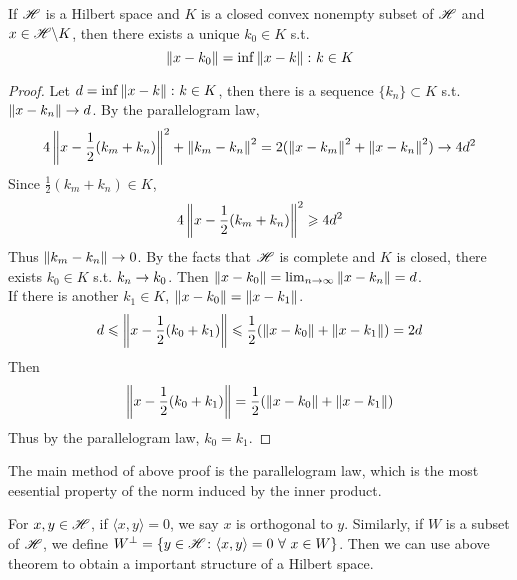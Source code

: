 \documentclass[a4paper,11pt]{report}
\begin{document}
\begin{thm}
	If $\mathscr{H}$ is a Hilbert space and $K$ is a closed convex nonempty subset of $\mathscr{H}$ and $x \in \mathscr{H} \backslash K$, then there exists a unique $k_0 \in K$ s.t.
	\begin{equation*}
		\left\lVert x-k_0\right\lVert = \operatorname{inf}{\left\lVert x-k\right\lVert \colon k \in K}
	\end{equation*}
\end{thm}
\begin{proof}
	Let $d=\operatorname{inf}{\left\lVert x-k\right\lVert \colon k \in K}$, then there is a sequence $\{k_n\} \subset K$ s.t. $\left\lVert x-k_n\right\lVert \rightarrow d$. By the parallelogram law,
	\begin{equation*}
		4\left\lVert x-\frac{1}{2}(k_m+k_n)\right\lVert^{2}+\left\lVert k_m-k_n\right\lVert^{2} = 2(\left\lVert x-k_m\right\lVert^{2}+\left\lVert x-k_n\right\lVert^{2}) \rightarrow 4d^{2}
	\end{equation*}
	Since $\frac{1}{2}(k_m+k_n) \in K$, 
	\begin{equation*}
		4\left\lVert x-\frac{1}{2}(k_m+k_n)\right\lVert^{2} \geqslant 4d^{2}
	\end{equation*}
	Thus $\left\lVert k_m-k_n\right\lVert \rightarrow 0$. By the facts that $\mathscr{H}$ is complete and $K$ is closed, there exists $k_0 \in K$ s.t. $k_n \rightarrow k_0$. Then $\left\lVert x-k_0\right\lVert = \lim_{n \rightarrow \infty}\left\lVert x-k_n\right\lVert = d$.\\
	If there is another $k_1 \in K$, $\left\lVert x-k_0\right\lVert = \left\lVert x-k_1\right\lVert$.
	\begin{equation*}
		d \leqslant \left\lVert x-\frac{1}{2}(k_0+k_1)\right\lVert \leqslant \frac{1}{2}(\left\lVert x-k_0\right\lVert+\left\lVert x-k_1\right\lVert) = 2d
	\end{equation*}
	Then
	\begin{equation*}
		\left\lVert x-\frac{1}{2}(k_0+k_1)\right\lVert = \frac{1}{2}(\left\lVert x-k_0\right\lVert+\left\lVert x-k_1\right\lVert)
	\end{equation*}
	Thus by the parallelogram law, $k_0 = k_1$.
\end{proof}	
\begin{rem}
	The main method of above proof is the parallelogram law, which is the most eesential property of the norm induced by the inner product.
\end{rem}

For $x,y \in \mathscr{H}$, if $ \langle x,y \rangle=0$, we say $x$ is orthogonal to $y$. Similarly, if $W$ is a subset of $\mathscr{H}$, we define $W^{\bot} = \{y \in \mathscr{H} \colon  \langle x,y \rangle=0 ~\forall~ x \in W\}$. Then we can use above theorem to obtain a important structure of a Hilbert space.
\end{document}
